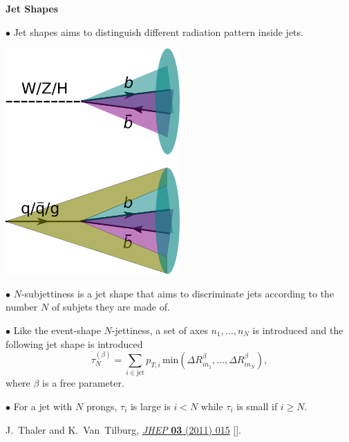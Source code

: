 \documentclass[9pt,a4paper,unknownkeysallowed,xcolor=dvipsnames,aspectratio=43]{beamer}
\begin{document}
%
%
\begin{frame}{\bf \huge Jet Shapes}
\vspace{2mm}

{\color{darkred}\Large$\bullet$} Jet shapes aims to distinguish different radiation pattern inside jets.

\begin{center}
    \includegraphics[width=0.5\textwidth]{05/softpattern.png}\\\vspace{2mm}
\end{center}
\end{frame}
%
%
\begin{frame}
\vspace{2mm}

{\color{darkred}\Large$\bullet$ $N$-subjettiness} is a jet shape that aims to discriminate jets according to the number $N$ of subjets they are made of.\\\vspace{8mm}

{\color{darkred}\Large$\bullet$} Like the event-shape $N$-jettiness, a set of axes $n_1,\dots,n_N$ is introduced and the following jet shape is introduced
\begin{equation}\label{eq:Nsubjettiness}
  \tau_N^{(\beta)} = \sum_{i\in\text{jet}} p_{T, i}\,
  {\text{min}}(\Delta R_{in_1}^\beta,\dots,\Delta R_{in_N}^\beta),
\end{equation}
where $\beta$ is a free parameter.\\\vspace{8mm}

{\color{darkred}\Large$\bullet$} For a jet with $N$ prongs, $\tau_i$ is large is $i<N$ while $\tau_i$ is small if $i\geq N$.\\\vspace{4mm}
\begin{center}
    {\tiny \color{teablue}J.~Thaler and K.~Van~Tilburg,%
    \href{https://doi.org/10.1007/JHEP03(2011)015}{\emph{JHEP}
  {\bfseries 03} (2011) 015} [\href{https://arxiv.org/abs/1011.2268}{{}}].}
\end{center}
\end{frame}
\end{document}
